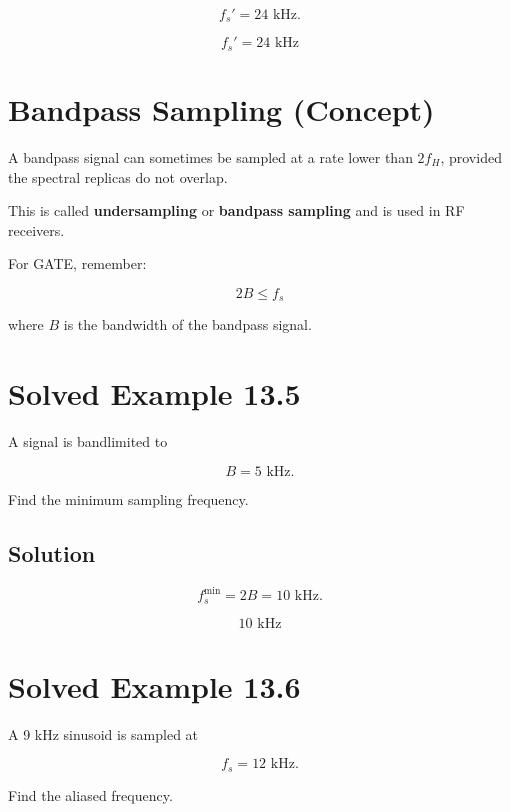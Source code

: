 \[
f_s'=24\text{ kHz}.
\]

\[
\boxed{
f_s'=24\text{ kHz}
}
\]


\section{Bandpass Sampling (Concept)}

A bandpass signal can sometimes be sampled at a rate lower than \(2f_H\), provided
the spectral replicas do not overlap.

This is called \textbf{undersampling} or \textbf{bandpass sampling} and is used in
RF receivers.

For GATE, remember:

\[
\boxed{
2B\le f_s
}
\]

where \(B\) is the bandwidth of the bandpass signal.


\section{Solved Example 13.5}

A signal is bandlimited to

\[
B=5\text{ kHz}.
\]

Find the minimum sampling frequency.


\subsection{Solution}

\[
f_s^{\min}=2B=10\text{ kHz}.
\]

\[
\boxed{
10\text{ kHz}
}
\]


\section{Solved Example 13.6}

A 9 kHz sinusoid is sampled at

\[
f_s=12\text{ kHz}.
\]

Find the aliased frequency.

